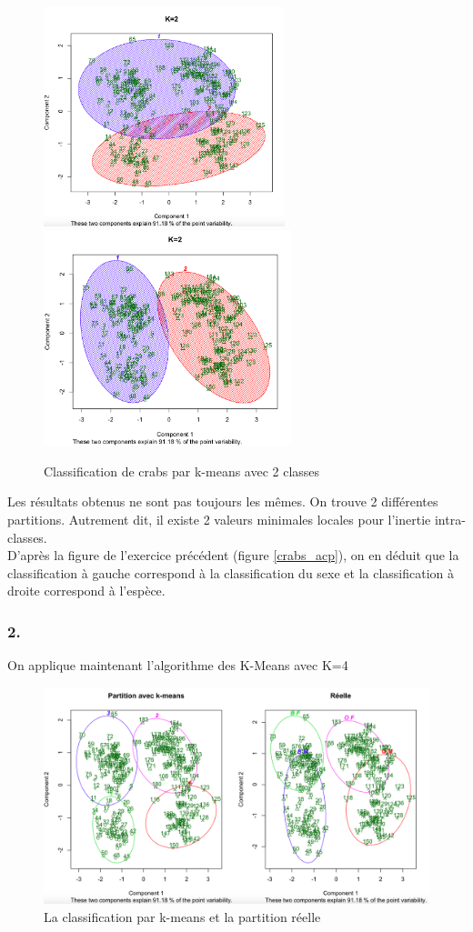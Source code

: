 \documentclass{article}
\begin{document}
\begin{figure}[H]
\centering
\includegraphics[width=7cm]{./img/crabs_kmeans_2.png}
\includegraphics[width=7.2cm]{./img/crabs_kmeans_2_2.png}
\caption{Classification de crabs par k-means avec 2 classes}
\label{crabs_kmeans_2}
\end{figure}

Les résultats obtenus ne sont pas toujours les mêmes. On trouve 2 différentes partitions. Autrement dit, il existe 2 valeurs minimales locales pour l'inertie intra-classes.\\ 
D'après la figure de l'exercice précédent (figure \ref{crabs_acp}), on en déduit que la classification à gauche correspond à la classification du sexe et la classification à droite correspond à l'espèce.


\subsubsection*{2.}

On applique maintenant l'algorithme des K-Means avec K=4

\begin{figure}[H]
\centering
\includegraphics[width=13cm]{./img/crabs_classification_reelle.png}
\caption{La classification par k-means et la partition réelle}
\label{crabs_comparaison}
\end{figure}
\end{document}
